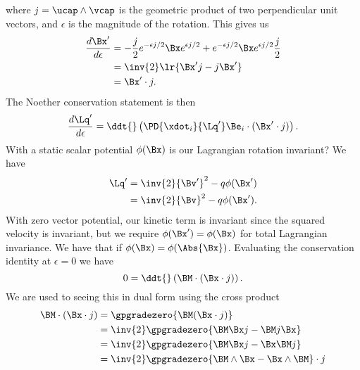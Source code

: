 {%
where \(j = \ucap \wedge \vcap\) is the geometric product of two perpendicular unit vectors, and \(\epsilon\) is the magnitude of the rotation.  This gives us
%
\begin{equation}\label{eqn:classicalMechanicsPs2:750}
\begin{aligned}
\frac{d\Bx'}{d\epsilon}
&= -\frac{j}{2} e^{-\epsilon j/2} \Bx e^{\epsilon j/2} + e^{-\epsilon j/2} \Bx e^{\epsilon j/2} \frac{j}{2} \\
&= \inv{2} \lr{ \Bx' j - j \Bx' } \\
&= \Bx' \cdot j.
\end{aligned}
\end{equation}
%
The Noether conservation statement is then
%
\begin{equation}\label{eqn:classicalMechanicsPs2:770}
\frac{d\Lq'}{d\epsilon} = \ddt{} \left( \PD{\xdot_i}{\Lq'} \Be_i \cdot (\Bx' \cdot j) \right).
\end{equation}
%
With a static scalar potential \(\phi(\Bx)\) is our Lagrangian rotation invariant?  We have
%
\begin{equation}\label{eqn:classicalMechanicsPs2:790}
\begin{aligned}
\Lq'
&= \inv{2} {\Bv'}^2 - q \phi(\Bx') \\
&= \inv{2} {\Bv}^2 - q \phi(\Bx').
\end{aligned}
\end{equation}
%
With zero vector potential, our kinetic term is invariant since the squared velocity is invariant, but we require \(\phi(\Bx') = \phi(\Bx)\) for total Lagrangian invariance.  We have that if \(\phi(\Bx) = \phi(\Abs{\Bx})\).
%
Evaluating the conservation identity  at \(\epsilon = 0\) we have
%
\begin{equation}\label{eqn:classicalMechanicsPs2:810}
0
= \ddt{} \left( \BM \cdot (\Bx \cdot j) \right).
\end{equation}
%
We are used to seeing this in dual form using the cross product
%
\begin{equation}\label{eqn:classicalMechanicsPs2:830}
\begin{aligned}
\BM \cdot (\Bx \cdot j)
&= \gpgradezero{ \BM (\Bx \cdot j) } \\
&= \inv{2} \gpgradezero{ \BM \Bx j - \BM j \Bx } \\
&= \inv{2} \gpgradezero{ \BM \Bx j - \Bx \BM j } \\
&= \inv{2} \gpgradezero{ \BM \wedge \Bx - \Bx \wedge \BM } \cdot j \\

\end{aligned}
\end{equation}}
